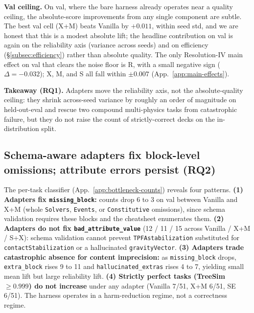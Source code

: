 \documentclass{article}
\begin{document}
\label{subsec:per-task}\textbf{Val ceiling.} On val, where the bare harness already operates near a quality ceiling, the absolute-score improvements from any single component are subtle. The best val cell (X+M) beats Vanilla by $+0.011$, within seed std, and we are honest that this is a modest absolute lift; the headline contribution on val is again on the reliability axis (variance across seeds) and on efficiency (\S\ref{subsec:efficiency}) rather than absolute quality. The only Resolution-IV main effect on val that clears the noise floor is R, with a small negative sign ($\Delta = -0.032$); X, M, and S all fall within $\pm 0.007$ (App.~\ref{app:main-effects}). 

\textbf{Takeaway (RQ1).} Adapters move the reliability axis, not the absolute-quality ceiling: they shrink across-seed variance by roughly an order of magnitude on held-out-eval and rescue two compound multi-physics tasks from catastrophic failure, but they do not raise the count of strictly-correct decks on the in-distribution split.

\subsection{Schema-aware adapters fix block-level omissions; attribute errors persist (RQ2)}
\label{subsec:bottleneck-results}

The per-task classifier (App.~\ref{app:bottleneck-counts}) reveals four patterns. \textbf{(1) Adapters fix \texttt{missing\_block}:} counts drop 6 to 3 on val between Vanilla and X+M (whole \texttt{Solvers}, \texttt{Events}, or \texttt{Constitutive} omissions), since schema validation requires these blocks and the cheatsheet enumerates them. \textbf{(2) Adapters do not fix \texttt{bad\_attribute\_value}} (12 / 11 / 15 across Vanilla / X+M / S+X): schema validation cannot prevent \texttt{TPFAstabilization} substituted for \texttt{contactStabilization} or a hallucinated \texttt{gravityVector}. \textbf{(3) Adapters trade catastrophic absence for content imprecision:} as \texttt{missing\_block} drops, \texttt{extra\_block} rises 9 to 11 and \texttt{hallucinated\_extras} rises 4 to 7, yielding small mean lift but large reliability lift. \textbf{(4) Strictly perfect tasks (TreeSim $\geq 0.999$) do not increase} under any adapter (Vanilla 7/51, X+M 6/51, SE 6/51). The harness operates in a harm-reduction regime, not a correctness regime.
\end{document}
